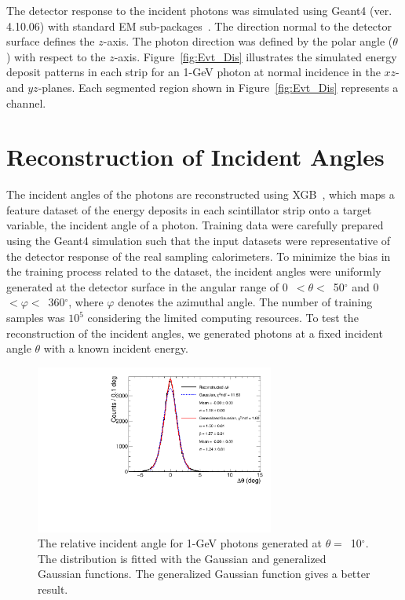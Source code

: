 \documentclass[preprint,12pt,times,a4paper]{elsarticle}
\begin{document}
The detector response to the incident photons was simulated using Geant4 (ver. 4.10.06) with standard EM sub-packages~\cite{GEANT4}. The direction normal to the detector surface defines the $z$-axis. The photon direction was defined by the polar angle ($\theta$) with respect to the $z$-axis. Figure~\ref{fig:Evt_Dis} illustrates the simulated energy deposit patterns in each strip for an 1-GeV photon at normal incidence in the $xz$- and $yz$-planes. Each segmented region shown in Figure~\ref{fig:Evt_Dis} represents a channel.

\section{Reconstruction of Incident Angles}
\label{sec:res}

The incident angles of the photons are reconstructed using XGB~\cite{xgboost:2016}, which maps a feature dataset of the energy deposits in each scintillator strip onto a target variable, the incident angle of a photon. Training data were carefully prepared using the Geant4 simulation such that the input datasets were representative of the detector response of the real sampling calorimeters. To minimize the bias in the training process related to the dataset, the incident angles were uniformly generated at the detector surface in the angular range of 0~$<\theta<$~50$^{\circ}$ and 0~$<\varphi<$~360$^{\circ}$, where $\varphi$ denotes the azimuthal angle. The number of training samples was $10^{5}$ considering the limited computing resources. To test the reconstruction of the incident angles, we generated photons at a fixed incident angle $\theta$ with a known incident energy.

\begin{figure}[!hbt]
\centering
\includegraphics[width=0.7\textwidth]{figures/Fig3_fit_GG.pdf}
\caption{ The relative incident angle for 1-GeV photons generated at $\theta=$~10$^{\circ}$. The distribution is fitted with the Gaussian and generalized Gaussian functions. The generalized Gaussian function gives a better result.}
\label{fig:angle_10degree}
\end{figure}
\end{document}
